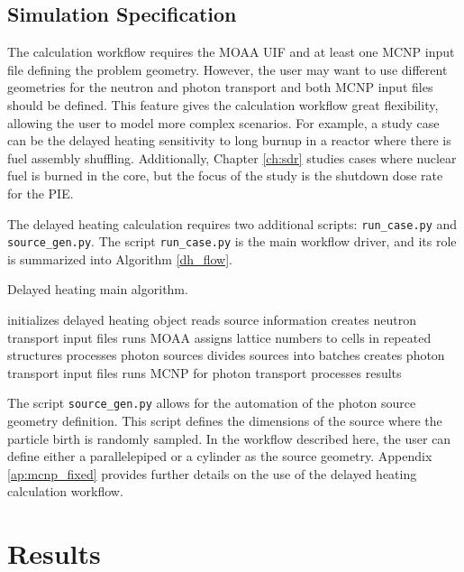 \subsection{Simulation Specification}

The calculation workflow requires the MOAA UIF and at least one MCNP input file defining the problem geometry.
However, the user may want to use different geometries for the neutron and photon transport and both MCNP input files should be defined.
This feature gives the calculation workflow great flexibility, allowing the user to model more complex scenarios.
For example, a study case can be the delayed heating sensitivity to long burnup in a reactor where there is fuel assembly shuffling.
Additionally, Chapter \ref{ch:sdr} studies cases where nuclear fuel is burned in the core, but the focus of the study is the shutdown dose rate for the \gls*{PIE}.

The delayed heating calculation requires two additional scripts: \texttt{run\_case.py} and \texttt{source\_gen.py}.
The script \texttt{run\_case.py} is the main workflow driver, and its role is summarized into Algorithm \ref{dh_flow}.

\begin{algorithm}
  \caption{Delayed heating main algorithm.}
  \label{dh_flow}
  \begin{algorithmic}[1]
    \State initializes delayed heating object
    \State reads source information
    \State creates neutron transport input files
    \State runs MOAA
    \State assigns lattice numbers to cells in repeated structures
    \State processes photon sources
    \State divides sources into batches
    \State creates photon transport input files
    \State runs MCNP for photon transport
    \State processes results
  \end{algorithmic}
\end{algorithm}

The script \texttt{source\_gen.py} allows for the automation of the photon source geometry definition.
This script defines the dimensions of the source where the particle birth is randomly sampled.
In the workflow described here, the user can define either a parallelepiped or a cylinder as the source geometry.
Appendix \ref{ap:mcnp_fixed} provides further details on the use of the delayed heating calculation workflow.


\section{Results}
\label{sec:results}


